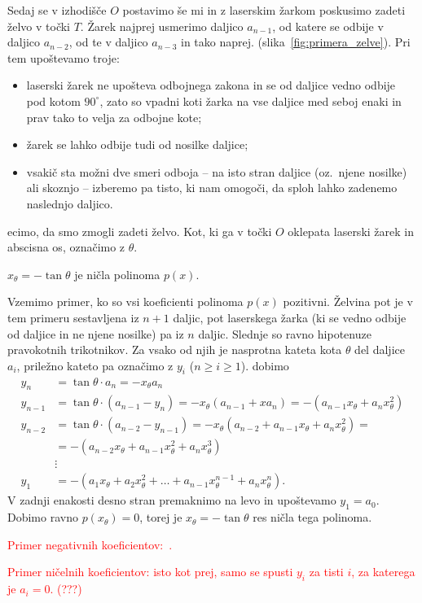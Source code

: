 Sedaj se v izhodišče $O$ postavimo še mi in z laserskim žarkom poskusimo zadeti želvo v točki $T$. Žarek najprej usmerimo daljico $a_{n-1}$, od katere se odbije v daljico $a_{n-2}$, od te v daljico $a_{n-3}$ in tako naprej. (slika~\ref{fig:primera_zelve}). Pri tem upoštevamo troje:
\begin{itemize}
    \item laserski žarek ne upošteva odbojnega zakona in se od daljice vedno odbije pod kotom $90^\circ$, zato so vpadni koti žarka na vse daljice med seboj enaki in prav tako to velja za odbojne kote;
    \item žarek se lahko odbije tudi od nosilke daljice;
    \item vsakič sta možni dve smeri odboja -- na isto stran daljice (oz.\ njene nosilke) ali skoznjo -- izberemo pa tisto, ki nam omogoči, da sploh lahko zadenemo naslednjo daljico.
\end{itemize}
ecimo, da smo zmogli zadeti želvo. Kot, ki ga v točki $O$ oklepata laserski žarek in abscisna os, označimo z $\theta$.

\begin{trditev}
    $x_{\theta} = - \tan \theta$ je ničla polinoma $p(x)$.
\end{trditev}

\begin{dokaz}
    Vzemimo primer, ko so vsi koeficienti polinoma $p(x)$ pozitivni. Želvina pot je v tem primeru sestavljena iz $n+1$ daljic, pot laserskega žarka (ki se vedno odbije od daljice in ne njene nosilke) pa iz $n$ daljic. Slednje so ravno hipotenuze pravokotnih trikotnikov. Za vsako od njih je nasprotna kateta kota $\theta$ del daljice $a_i$, priležno kateto pa označimo z $y_i$ ($ n \geq i \geq 1$). dobimo
    \begin{align*}
        y_n &= \tan \theta \cdot a_n = - x_{\theta} a_n \\
        y_{n-1} &= \tan \theta \cdot (a_{n-1} - y_n) = - x_{\theta} (a_{n-1} + x a_n) = - (a_{n-1} x_{\theta} + a_n x_{\theta}^2)\\
        y_{n-2} &= \tan \theta \cdot (a_{n-2} - y_{n-1}) = - x_{\theta} (a_{n-2} + a_{n-1} x_{\theta} + a_n x_{\theta}^2) = \\
        &= - (a_{n-2} x_{\theta} + a_{n-1} x_{\theta}^2 + a_n x_{\theta}^3) \\
        &\vdots \\
        y_1 &= - (a_1 x_{\theta} + a_2 x_{\theta}^2 + \ldots + a_{n-1} x_{\theta}^{n-1} + a_n x_{\theta}^n).
    \end{align*}
    V zadnji enakosti desno stran premaknimo na levo in upoštevamo $y_1 = a_0$. Dobimo ravno $p(x_{\theta}) = 0$, torej je $x_{\theta} = - \tan \theta$ res ničla tega polinoma.

    \textcolor{red}{Primer negativnih koeficientov:~\cite[str.\ 36]{zore2022}.}

    \textcolor{red}{Primer ničelnih koeficientov: isto kot prej, samo se spusti $y_i$ za tisti $i$, za katerega je $a_i = 0$. (\textcolor{red}{???})}
\end{dokaz}

